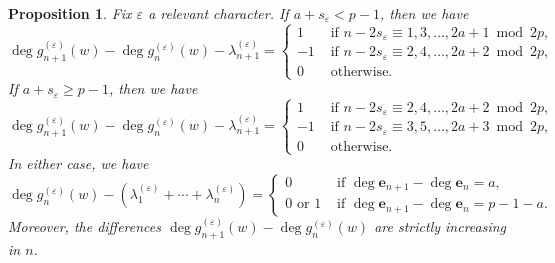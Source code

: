 \documentclass[12pt]{amsart}
\newtheorem{proposition}[subsection]{Proposition}
\theoremstyle{definition}
\numberwithin{equation}{subsection}
\def\bfe{\mathbf{e}}
\begin{document}
\begin{proposition}
\label{P:increment of degrees in ghost series}
Fix $\varepsilon$ a relevant character.  If $a+s_\varepsilon<p-1$, then we have
\begin{equation}
\label{E:increment of degree a+s<p-1}
\deg g_{n+1}^{(\varepsilon)}(w) - \deg g_{n}^{(\varepsilon)}(w) - \lambda_{n+1}^{(\varepsilon)} =\begin{cases}
1 & \textrm{ if } n - 2s_\varepsilon \equiv 1, 3, \dots, 2a+1 \bmod {2p},
\\
-1 & \textrm{ if } n- 2s_{\varepsilon} \equiv 2, 4, \dots, 2a+2 \bmod{2p},
\\
0 & \textrm{ otherwise.}
\end{cases}
\end{equation}
If $a+s_\varepsilon\geq p-1$, then we have
\begin{equation}
\label{E:increment of degree a+s>=p-1}
\deg g_{n+1}^{(\varepsilon)}(w) - \deg g_{n}^{(\varepsilon)}(w) - \lambda_{n+1}^{(\varepsilon)} =\begin{cases}
1 & \textrm{ if } n - 2s_\varepsilon \equiv 2, 4, \dots, 2a+2 \bmod {2p},
\\
-1 & \textrm{ if } n- 2s_{\varepsilon} \equiv 3, 5, \dots, 2a+3 \bmod{2p},
\\
0 & \textrm{ otherwise.}
\end{cases}
\end{equation}
In either case, we have
\begin{equation}
\label{E:degree approx halo bound}
\deg g_n^{(\varepsilon)}(w) - (\lambda_1^{(\varepsilon)}+\cdots + \lambda_n^{(\varepsilon)}) = \begin{cases}
0 & \textrm{ if }\deg \bfe_{n+1}-\deg\bfe_n = a,\\
0 \textrm{ or }1 & \textrm{ if }\deg \bfe_{n+1}-\deg\bfe_n = p-1-a.
\end{cases}
\end{equation}
Moreover, the differences $\deg g_{n+1}^{(\varepsilon)}(w) - \deg g_n^{(\varepsilon)}(w)$ are strictly increasing in $n$.
\end{proposition}
\end{document}
